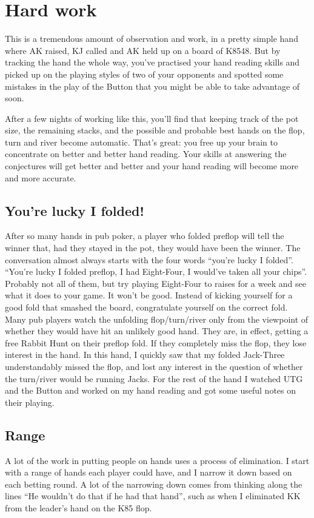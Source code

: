 \section{Hard work}

This is a tremendous amount of observation and work, in a pretty simple
hand where AK raised, KJ called and AK held up on a board of K8548. But
by tracking the hand the whole way, you've practised your hand reading skills
and picked up on the playing styles of two of your opponents and spotted
some mistakes in the play of the Button that you might be able to
take advantage of soon.

After a few nights of working like this, you'll find that keeping track
of the pot size, the remaining stacks, and the possible and probable
best hands on the flop, turn and river become automatic. That's great: you
free up your brain to concentrate on better and better hand reading. Your
skills at answering the conjectures will get better and better and your
hand reading will become more and more accurate.

\subsection*{You're lucky I folded!}

After so many hands in pub poker, a player who folded preflop will
tell the winner that, had they stayed in the pot, they would have been
the winner. The conversation almost always starts with the four words
``you're lucky I folded''. ``You're lucky I folded preflop, I had
Eight-Four, I would've taken all your chips''. Probably not all of
them, but try playing Eight-Four to raises for a week and see what it
does to your game. It won't be good. Instead of kicking yourself for a
good fold that smashed the board, congratulate yourself on the correct
fold. Many pub players watch the unfolding
flop/turn/river only from the viewpoint of whether they would have hit
an unlikely good hand. They are, in effect, getting a free Rabbit Hunt
on their preflop fold. If they completely miss the flop, they lose
interest in the hand. In this hand, I quickly saw that my folded
Jack-Three understandably missed the flop, and lost any interest in
the question of whether the turn/river would be running Jacks. For the
rest of the hand I watched UTG and the Button and worked on my hand
reading and got some useful notes on their playing.

\subsection*{Range}
A lot of the work in putting people on hands uses a process
of elimination. I start with a range of hands each player could have,
and I narrow it down based on each betting round. A lot of the narrowing
down comes from thinking along the lines ``He wouldn't do that if he
had that hand'', such as when I eliminated KK from the leader's hand
on the K85 flop.

